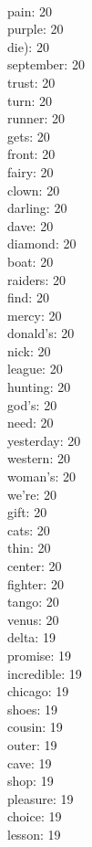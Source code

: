 \begin{multicols}{6}
  \\ pain: 20
  \\ purple: 20
  \\ die): 20
  \\ september: 20
  \\ trust: 20
  \\ turn: 20
  \\ runner: 20
  \\ gets: 20
  \\ front: 20
  \\ fairy: 20
  \\ clown: 20
  \\ darling: 20
  \\ dave: 20
  \\ diamond: 20
  \\ boat: 20
  \\ raiders: 20
  \\ find: 20
  \\ mercy: 20
  \\ donald's: 20
  \\ nick: 20
  \\ league: 20
  \\ hunting: 20
  \\ god's: 20
  \\ need: 20
  \\ yesterday: 20
  \\ western: 20
  \\ woman's: 20
  \\ we're: 20
  \\ gift: 20
  \\ cats: 20
  \\ thin: 20
  \\ center: 20
  \\ fighter: 20
  \\ tango: 20
  \\ venus: 20
  \\ delta: 19
  \\ promise: 19
  \\ incredible: 19
  \\ chicago: 19
  \\ shoes: 19
  \\ cousin: 19
  \\ outer: 19
  \\ cave: 19
  \\ shop: 19
  \\ pleasure: 19
  \\ choice: 19
  \\ lesson: 19

\end{multicols}
